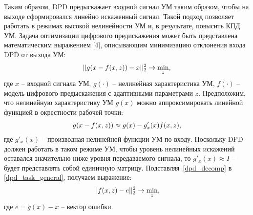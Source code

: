 Таким образом, DPD предыскажает входной сигнал УМ таким образом, чтобы на выходе сформировался линейно искаженный сигнал. Такой подход позволяет работать в режимах высокой нелинейности УМ и, в результате, повысить КПД УМ. 
Задача оптимизации цифрового предискажения может быть представлена математическим выражением [4], описывающим минимизацию отклонения входа DPD от выхода УМ:
\begin{equation}
	\displaystyle||g(x - f(x, z)) - x||_2^2 \rightarrow \displaystyle\min_{z},
	\label{dpd_task_general}
\end{equation}
где $x$ -- входной сигнала УМ, $g(\cdot)$ -- нелинейная характеристика УМ, $f(\cdot)$ -- модель цифрового предыскажения с адаптивными параметрами $z$.
Предположим, что нелинейную характеристику УМ $g(x)$  можно аппроксимировать линейной функцией в окрестности рабочей точки:
\begin{equation}
	\displaystyle g(x - f(x, z)) \approx g(x) - g'_x(x)f(x, z),
	\label{dpd_decomp}
\end{equation}
где $g'_x(x)$ -- производная нелинейной функции УМ по входу. Поскольку DPD должен работать в таком режиме УМ, чтобы уровень нелинейных искажений оставался значительно ниже уровня передаваемого сигнала, то $g'_x(x)\approx I$ -- будет представлять собой единичную матрицу. Подставляя~\eqref{dpd_decomp} в \eqref{dpd_task_general}, получаем выражение:
\begin{equation}
	\displaystyle||f(x, z) - e||_2^2 \rightarrow \displaystyle\min_{z},
	\label{dpd_task_simplif}
\end{equation}
где $e=g(x) - x$ -- вектор ошибки.

